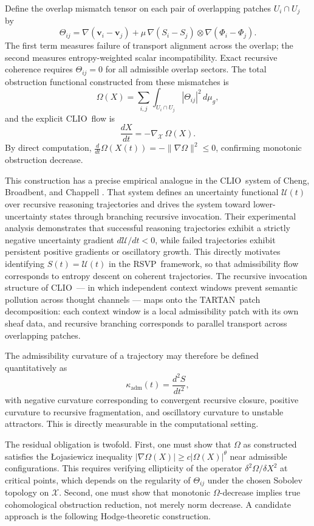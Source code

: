 \documentclass[12pt,a4paper]{article}
\newcommand{\RSVP}{\textrm{RSVP}}
\newcommand{\CLIO}{\textrm{CLIO}}
\newcommand{\TARTAN}{\textrm{TARTAN}}
\newcommand{\Field}{\mathcal{X}}
\begin{document}
Define the overlap mismatch tensor on each pair of overlapping patches
$U_i\cap U_j$ by
\[
\Theta_{ij}
= \nabla(\mathbf{v}_i-\mathbf{v}_j)
+ \mu\,\nabla(S_i-S_j)\otimes\nabla(\Phi_i-\Phi_j).
\]
The first term measures failure of transport alignment across the overlap; the
second measures entropy-weighted scalar incompatibility. Exact recursive
coherence requires $\Theta_{ij}=0$ for all admissible overlap sectors. The
total obstruction functional constructed from these mismatches is
\[
\Omega(X) = \sum_{i,j}\int_{U_i\cap U_j}|\Theta_{ij}|^2\,d\mu_g,
\]
and the explicit \CLIO\ flow is
\[
\frac{dX}{dt} = -\nabla_\Field\,\Omega(X).
\]
By direct computation, $\frac{d}{dt}\Omega(X(t))=-\|\nabla\Omega\|^2\leq 0$,
confirming monotonic obstruction decrease.

This construction has a precise empirical analogue in the \CLIO\ system of
Cheng, Broadbent, and Chappell \cite{Cheng2025}. That system defines an
uncertainty functional $\mathcal{U}(t)$ over recursive reasoning trajectories
and drives the system toward lower-uncertainty states through branching
recursive invocation. Their experimental analysis demonstrates that successful
reasoning trajectories exhibit a strictly negative uncertainty gradient
$d\mathcal{U}/dt<0$, while failed trajectories exhibit persistent positive
gradients or oscillatory growth. This directly motivates identifying
$S(t)=\mathcal{U}(t)$ in the \RSVP\ framework, so that admissibility flow
corresponds to entropy descent on coherent trajectories. The recursive
invocation structure of \CLIO\ --- in which independent context windows prevent
semantic pollution across thought channels --- maps onto the \TARTAN\ patch
decomposition: each context window is a local admissibility patch with its own
sheaf data, and recursive branching corresponds to parallel transport across
overlapping patches.

The admissibility curvature of a trajectory may therefore be defined
quantitatively as
\[
\kappa_\mathrm{adm}(t) = \frac{d^2S}{dt^2},
\]
with negative curvature corresponding to convergent recursive closure, positive
curvature to recursive fragmentation, and oscillatory curvature to unstable
attractors. This is directly measurable in the computational setting.

The residual obligation is twofold. First, one must show that $\Omega$ as
constructed satisfies the Łojasiewicz inequality
$|\nabla\Omega(X)|\geq c|\Omega(X)|^\theta$ near admissible configurations.
This requires verifying ellipticity of the operator
$\delta^2\Omega/\delta X^2$ at critical points, which depends on the regularity
of $\Theta_{ij}$ under the chosen Sobolev topology on $\Field$. Second, one
must show that monotonic $\Omega$-decrease implies true cohomological
obstruction reduction, not merely norm decrease. A candidate approach is the
following Hodge-theoretic construction.
\end{document}
